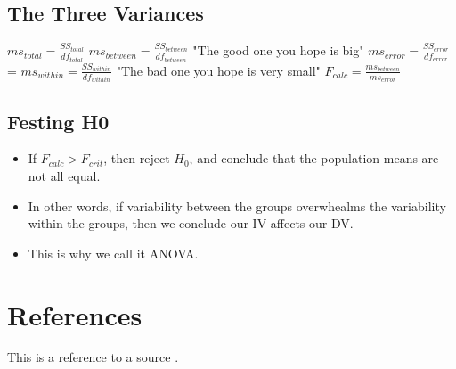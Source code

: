 \documentclass[11pt]{report}
\begin{document}
\subsection{The Three Variances}
$ms_{total} = \frac{SS_{total}}{df_{total}}$ \newline
$ms_{between} = \frac{SS_{between}}{df_{between}}$ "The good one you hope is big" \newline
$ms_{error} = \frac{SS_{error}}{df_{error}}$ = $ms_{within} = \frac{SS_{within}}{df_{within}}$ "The bad one you hope is very small" \newline
$F_{calc} = \frac{ms_{between}}{ms_{error}}$ \newline

\subsection{Festing H0}
\begin{itemize}
    \item If $F_{calc} > F_{crit}$, then reject $H_0$, and conclude that the population means are not all equal.
    \item In other words, if variability between the groups overwhealms the variability within the groups, then we conclude our IV affects our DV. 
    \item This is why we call it ANOVA.
\end{itemize}


\section{References}
This is a reference to a source \cite{example}.



\end{document}
